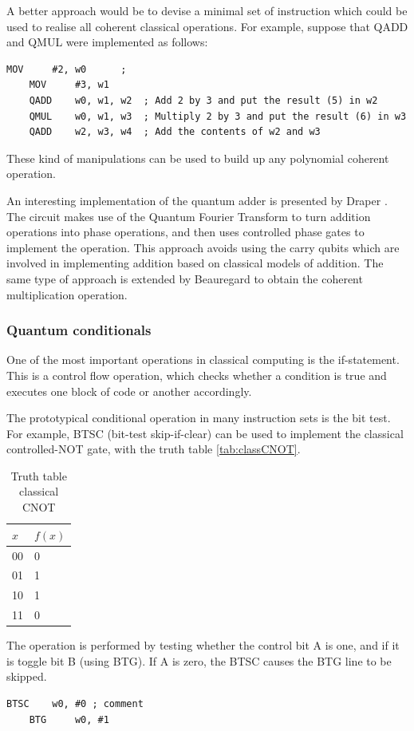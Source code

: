 A better approach would be to devise a minimal set of instruction which could be used to realise all coherent classical operations. For example, suppose that QADD and QMUL were implemented as follows:
\begin{lstlisting}[language=Asm]
    MOV     #2, w0      ; 
    MOV     #3, w1   
    QADD    w0, w1, w2  ; Add 2 by 3 and put the result (5) in w2
    QMUL    w0, w1, w3  ; Multiply 2 by 3 and put the result (6) in w3 
    QADD    w2, w3, w4  ; Add the contents of w2 and w3
\end{lstlisting}
These kind of manipulations can be used to build up any polynomial coherent operation. 

An interesting implementation of the quantum adder is presented by Draper \cite{draper2000addition}. The circuit makes use of the Quantum Fourier Transform to turn addition operations into phase operations, and then uses controlled phase gates to implement the operation. This approach avoids using the carry qubits which are involved in implementing addition based on classical models of addition. The same type of approach is extended by Beauregard \cite{beauregard2003ShorImplementation} to obtain the coherent multiplication operation.


\subsubsection{Quantum conditionals}

One of the most important operations in classical computing is the if-statement. This is a control flow operation, which checks whether a condition is true and executes one block of code or another accordingly.

The prototypical conditional operation in many instruction sets is the bit test. For example, BTSC (bit-test skip-if-clear) can be used to implement the classical controlled-NOT gate, with the truth table 
\autoref{tab:classCNOT}.
\begin{table}[!htb]
    \caption{Truth table classical CNOT}
    \label{tab:classCNOT}
      \centering
        \begin{tabular}{|l||l|}
        \hline
        $x$ & $f(x)$ \\ \hline
        00  & 0      \\ 
        01  & 1       \\ 
        10  & 1       \\ 
        11  & 0       \\
        \hline
    \end{tabular}
\end{table}
The operation is performed by testing whether the control bit A is one, and if it is toggle bit B (using BTG). If A is zero, the BTSC causes the BTG line to be skipped.
\begin{lstlisting}[language=Asm]
    BTSC    w0, #0 ; comment
    BTG     w0, #1
\end{lstlisting}

